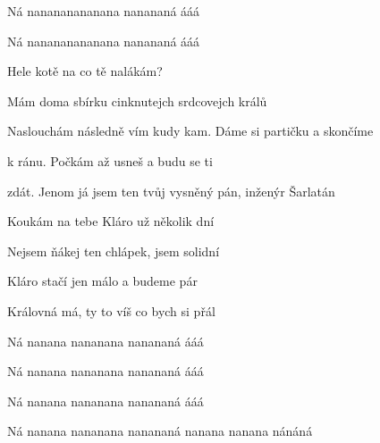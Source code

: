 \begin{song}
\bigskip

Ná nanananananana nanananá ááá \par
{}Ná nanananananana nanananá ááá \par

\bigskip

Hele kotě na co tě nalákám? \par
{} Mám doma sbírku cinknutejch srdcovejch králů \par
{}Naslouchám následně vím kudy kam.  Dáme si partičku a skončíme \par
{}k ránu. Počkám až usneš  a budu se ti \par
{}zdát. Jenom já jsem ten tvůj vysněný pán, inženýr Šarlatán \par

\bigskip

Koukám na tebe Kláro už několik dní   \par
{}Nejsem ňákej ten chlápek, jsem solidní   \par
{}Kláro stačí jen málo a budeme pár   \par
{}Královná má, ty to víš co bych si přál   \par

\bigskip

Ná nanana nananana nanananá ááá \par
{}Ná nanana nananana nanananá ááá \par
{}Ná nanana nananana nanananá ááá \par
{}Ná nanana nananana nanananá nanana nanana nánáná \par

\end{song}
